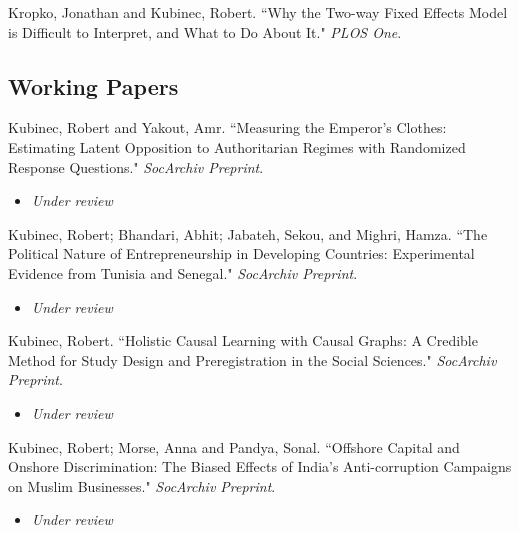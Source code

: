 \documentclass[11pt, a4paper]{article}
\newcommand{\years}[1]{\marginnote{\scriptsize #1}}
\begin{document}
\years{2020}Kropko, Jonathan and Kubinec, Robert. ``Why the Two-way Fixed Effects Model is Difficult to Interpret, and What to Do About It." \textit{PLOS One}. 

\subsection*{Working Papers}
\noindent

\years{2025} Kubinec, Robert and Yakout, Amr. ``Measuring the Emperor's Clothes: Estimating Latent Opposition to Authoritarian Regimes with Randomized Response Questions." \emph{SocArchiv Preprint}. \\

\begin{itemize}
	\item \emph{Under review}
\end{itemize}


\years{2025} Kubinec, Robert; Bhandari, Abhit; Jabateh, Sekou, and Mighri, Hamza. ``The Political Nature of Entrepreneurship in Developing Countries: Experimental Evidence from Tunisia and Senegal." \emph{SocArchiv Preprint}. \\

\begin{itemize}
	\item \emph{Under review}
\end{itemize}

\years{2024} Kubinec, Robert. ``Holistic Causal Learning with Causal Graphs: A Credible Method for Study Design and Preregistration in the Social Sciences." \emph{SocArchiv Preprint}. \\

\begin{itemize}
	\item \emph{Under review}
\end{itemize}

\years{2024} Kubinec, Robert; Morse, Anna and Pandya, Sonal. ``Offshore Capital and Onshore Discrimination: The Biased Effects of India's Anti-corruption Campaigns on Muslim Businesses." \emph{SocArchiv Preprint}. \\

\begin{itemize}
	\item \emph{Under review}
\end{itemize}
\end{document}
